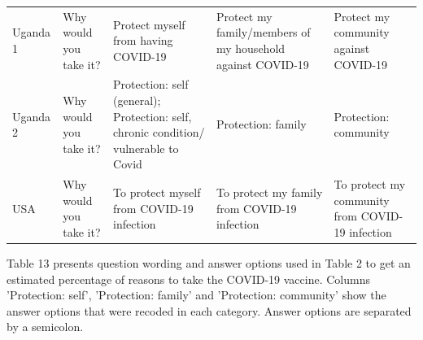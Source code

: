 \documentclass[
  12pt,
]{article}
\begin{document}
\begin{table}[!h]
{\begin{threeparttable}
\begin{tabular}[t]{>{\raggedright\arraybackslash}p{8em}>{\raggedright\arraybackslash}p{8em}>{\raggedright\arraybackslash}p{10em}>{\raggedright\arraybackslash}p{10em}>{\raggedright\arraybackslash}p{10em}}
Uganda 1 & Why would you take it? & Protect myself from having COVID-19 & Protect my family/members of my household against COVID-19 & Protect my community against COVID-19\\
Uganda 2 & Why would you take it? & Protection: self (general); Protection: self, chronic condition/ vulnerable to Covid & Protection: family & Protection: community\\
USA & Why would you take it? & To protect myself from COVID-19 infection & To protect my family from COVID-19 infection & To protect my community from COVID-19 infection\\
\bottomrule
\end{tabular}
\begin{tablenotes}
\item Table 13 presents question wording and answer options used in Table 2 to get an estimated percentage of reasons to take the COVID-19 vaccine. Columns 'Protection: self', 'Protection: family' and  'Protection: community' show the answer options that were recoded in each category. Answer options are separated by a semicolon.
\end{tablenotes}
\end{threeparttable}}
\end{table}
\end{document}
